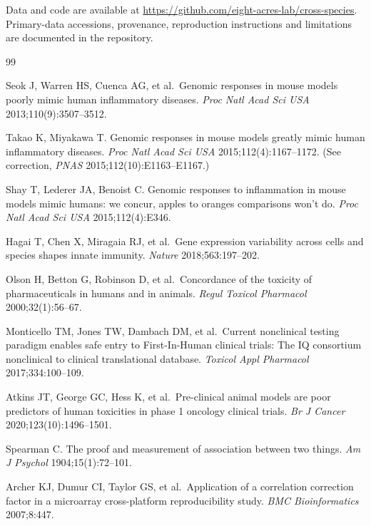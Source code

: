 \documentclass[11pt,a4paper]{article}
\begin{document}
Data and code are available at
\url{https://github.com/eight-acres-lab/cross-species}. Primary-data
accessions, provenance, reproduction instructions and limitations are
documented in the repository.

\clearpage
{}
{}
\begingroup\small{}
\begin{thebibliography}{99}
\raggedright
{}
\setlength{\itemsep}{4pt}

Seok J, Warren HS, Cuenca AG, et al.~Genomic responses in mouse models poorly mimic human inflammatory diseases. \emph{Proc Natl Acad Sci USA} 2013;110(9):3507--3512.

Takao K, Miyakawa T. Genomic responses in mouse models greatly mimic human inflammatory diseases. \emph{Proc Natl Acad Sci USA} 2015;112(4):1167--1172. (See correction, \emph{PNAS} 2015;112(10):E1163--E1167.)

Shay T, Lederer JA, Benoist C. Genomic responses to inflammation in mouse models mimic humans: we concur, apples to oranges comparisons won't do. \emph{Proc Natl Acad Sci USA} 2015;112(4):E346.

Hagai T, Chen X, Miragaia RJ, et al.~Gene expression variability across cells and species shapes innate immunity. \emph{Nature} 2018;563:197--202.

Olson H, Betton G, Robinson D, et al.~Concordance of the toxicity of pharmaceuticals in humans and in animals. \emph{Regul Toxicol Pharmacol} 2000;32(1):56--67.

Monticello TM, Jones TW, Dambach DM, et al.~Current nonclinical testing paradigm enables safe entry to First-In-Human clinical trials: The IQ consortium nonclinical to clinical translational database. \emph{Toxicol Appl Pharmacol} 2017;334:100--109.

Atkins JT, George GC, Hess K, et al.~Pre-clinical animal models are poor predictors of human toxicities in phase 1 oncology clinical trials. \emph{Br J Cancer} 2020;123(10):1496--1501.

Spearman C. The proof and measurement of association between two things. \emph{Am J Psychol} 1904;15(1):72--101.

Archer KJ, Dumur CI, Taylor GS, et al.~Application of a correlation correction factor in a microarray cross-platform reproducibility study. \emph{BMC Bioinformatics} 2007;8:447.


\end{thebibliography}
\end{document}

